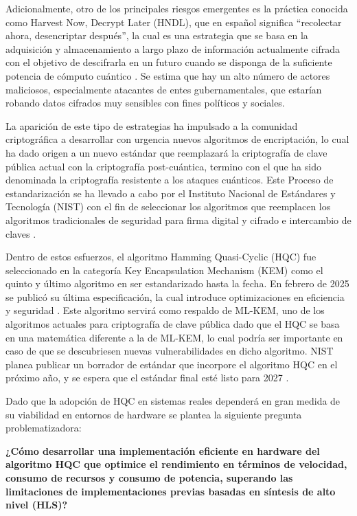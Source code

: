 Adicionalmente, otro de los principales riesgos emergentes es la práctica conocida como Harvest Now, Decrypt Later (HNDL), que en español significa “recolectar ahora, desencriptar después”, la cual es una estrategia que se basa en la adquisición y almacenamiento a largo plazo de información actualmente cifrada con el objetivo de descifrarla en un futuro cuando se disponga de la suficiente potencia de cómputo cuántico \cite{Olutimehin2025FutureProofing}. Se estima que hay un alto número de actores maliciosos, especialmente atacantes de entes gubernamentales, que estarían robando datos cifrados muy sensibles con fines políticos y sociales.

La aparición de este tipo de estrategias ha impulsado a la comunidad criptográfica a desarrollar con urgencia nuevos algoritmos de encriptación, lo cual ha dado origen a un nuevo estándar que reemplazará la criptografía de clave pública actual con la criptografía post-cuántica, termino con el que ha sido denominada la criptografía resistente a los ataques cuánticos. Este Proceso de estandarización se ha llevado a cabo por el Instituto Nacional de Estándares y Tecnología (NIST) con el fin de seleccionar los algoritmos que reemplacen los algoritmos tradicionales de seguridad para firma digital y cifrado e intercambio de claves \cite{CISA2022PreparePQC}.

Dentro de estos esfuerzos, el algoritmo Hamming Quasi-Cyclic (HQC) fue seleccionado en la categoría Key Encapsulation Mechanism (KEM) como el quinto y último algoritmo en ser estandarizado hasta la fecha. En febrero de 2025 se publicó su última especificación, la cual introduce optimizaciones en eficiencia y seguridad \cite{HQCspec2025}. Este algoritmo servirá como respaldo de ML-KEM, uno de los algoritmos actuales para criptografía de clave pública dado que el HQC se basa en una matemática diferente a la de ML-KEM, lo cual podría ser importante en caso de que se descubriesen nuevas vulnerabilidades en dicho algoritmo. NIST planea publicar un borrador de estándar que incorpore el algoritmo HQC en el próximo año, y se espera que el estándar final esté listo para 2027 \cite{NIST2025SelectHQC}.

Dado que la adopción de HQC en sistemas reales dependerá en gran medida de su viabilidad en entornos de hardware se plantea la siguiente pregunta problematizadora:

\textbf{¿Cómo desarrollar una implementación eficiente en hardware del algoritmo HQC que optimice el rendimiento en términos de velocidad, consumo de recursos y consumo de potencia, superando las limitaciones de implementaciones previas basadas en síntesis de alto nivel (HLS)?}

